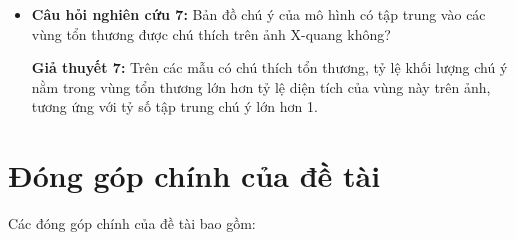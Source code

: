 \begin{itemize}
    \pagebreak

    \textbf{Giả thuyết 6:} Ít nhất một phương pháp hậu xử lý được khảo sát, gồm khoảng cách Mahalanobis, Cosine-kNN, Energy Score và khoảng cách đến mốc văn bản, đạt AUROC lớn hơn mức ngẫu nhiên trong việc phân biệt dữ liệu nội phân phối và ngoài phân phối; phương pháp được lựa chọn dựa trên tập hiệu chỉnh thay vì tập kiểm thử.

    \item \textbf{Câu hỏi nghiên cứu 7:} Bản đồ chú ý của mô hình có tập trung vào các vùng tổn thương được chú thích trên ảnh X-quang không?

    \textbf{Giả thuyết 7:} Trên các mẫu có chú thích tổn thương, tỷ lệ khối lượng chú ý nằm trong vùng tổn thương lớn hơn tỷ lệ diện tích của vùng này trên ảnh, tương ứng với tỷ số tập trung chú ý lớn hơn 1.
\end{itemize}

\section{Đóng góp chính của đề tài}
Các đóng góp chính của đề tài bao gồm:

